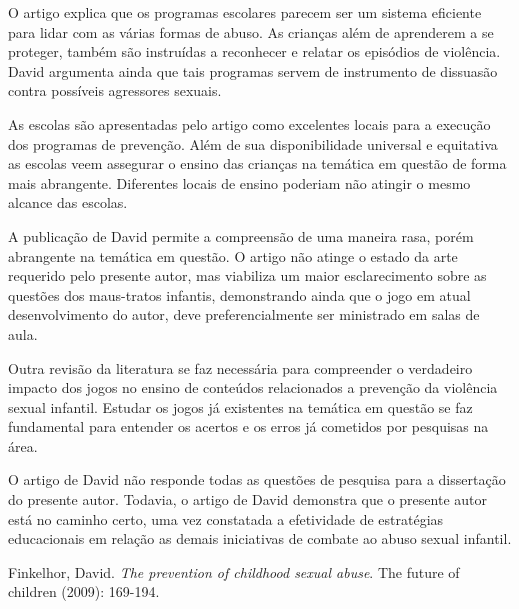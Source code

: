 \documentclass[12pt]{article}
\begin{document}
\newpage

O artigo explica que os programas escolares parecem ser um sistema eficiente para lidar com as várias formas de abuso. As crianças além de aprenderem a se proteger, também são instruídas a reconhecer e relatar os episódios de violência. David argumenta ainda que tais programas servem de instrumento de dissuasão contra possíveis agressores sexuais.

As escolas são apresentadas pelo artigo como excelentes locais para a execução dos programas de prevenção. Além de sua disponibilidade universal e equitativa as escolas veem assegurar o ensino das crianças na temática em questão de forma mais abrangente. Diferentes locais de ensino poderiam não atingir o mesmo alcance das escolas.

A publicação de David permite a compreensão de uma maneira rasa, porém abrangente na temática em questão. O artigo não atinge o estado da arte requerido pelo presente autor, mas viabiliza um maior esclarecimento sobre as questões dos maus-tratos infantis, demonstrando ainda que o jogo em atual desenvolvimento do autor, deve preferencialmente ser ministrado em salas de aula. 

Outra revisão da literatura se faz necessária para compreender o verdadeiro impacto dos jogos no ensino de conteúdos relacionados a prevenção da violência sexual infantil. Estudar os jogos já existentes na temática em questão se faz fundamental para entender os acertos e os erros já cometidos por pesquisas na área. 

O artigo de David não responde todas as questões de pesquisa para a dissertação do presente autor. Todavia, o artigo de David demonstra que o presente autor está no caminho certo, uma vez constatada a efetividade de estratégias educacionais em relação as demais iniciativas de combate ao abuso sexual infantil. 


\begin{thebibliography}{9}

Finkelhor, David.
\textit{The prevention of childhood sexual abuse}.
The future of children (2009): 169-194.

\end{thebibliography}
\end{document}
